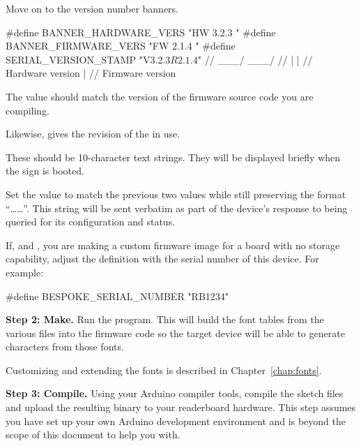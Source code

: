 Move on to the version number banners.

\begin{SourceCode}
#define BANNER_HARDWARE_VERS "HW 3.2.3  "
#define BANNER_FIRMWARE_VERS "FW 2.1.4  "
#define SERIAL_VERSION_STAMP "V3.2.3$R2.1.4$"
//                             \___/  \___/
//                               |      |
//                  Hardware version    |
//                         Firmware version
\end{SourceCode}

The  value should match the version of the firm\-ware source code you are compiling.

Likewise,  gives the revision of the  in use.


These should be 10-character text strings. They will be displayed briefly when the sign is booted.

Set the  value to match the previous two values while still preserving
the format ``\dots{}\dots\z{\$}''. This string will be sent verbatim as part
of the device's response to being queried for its configuration and status.

If, and , you are making a custom firmware image for a board with no 
storage capability, adjust the  definition with the serial
number of this device. For example:
\begin{SourceCode}
#define BESPOKE_SERIAL_NUMBER "RB1234"
\end{SourceCode}

{\bfseries Step 2: Make.}
		Run the  program. This will build the font tables from the various
		 files into the firmware code so the target device will be able to
		generate characters from those fonts.

		Customizing and extending the fonts is described in Chapter~\ref{chap:fonts}.

{\bfseries Step 3: Compile.}
		Using your Arduino compiler tools, compile the  sketch files and upload the
		resulting binary
		to your readerboard hardware. This step assumes you have set up your own Arduino
		development environment and is beyond the scope of this document to help you with.

